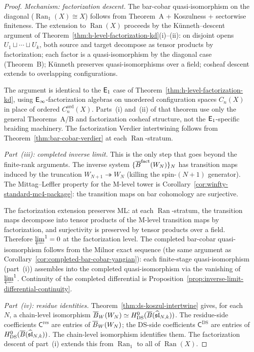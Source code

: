 \begin{proof}
\emph{Mechanism: factorization descent.}
The bar-cobar quasi-isomorphism on the diagonal
($\operatorname{Ran}_1(X) \cong X$) follows from Theorem~A +
Koszulness + sectorwise finiteness.  The extension to
$\operatorname{Ran}(X)$ proceeds by the
K\"unneth--descent argument of
Theorem~\ref{thm:h-level-factorization-kd}(i)--(ii): on
disjoint opens $U_1 \sqcup \cdots \sqcup U_k$, both source and
target decompose as tensor products by factorization; each factor
is a quasi-isomorphism by the diagonal case (Theorem~B);
K\"unneth preserves quasi-isomorphisms over a field; cosheaf
descent extends to overlapping configurations.

The argument is identical to the $\mathsf{E}_1$ case of
Theorem~\ref{thm:h-level-factorization-kd}, using
$\mathsf{E}_{\infty}$-factorization algebras on unordered configuration
spaces $C_n(X)$ in place of ordered $C_n^{\mathrm{ord}}(X)$.
Parts~(i) and~(ii) of that theorem use only the general
Theorems~A/B and factorization cosheaf structure, not the
$\mathsf{E}_1$-specific braiding machinery.
The factorization Verdier intertwining follows from
Theorem~\ref{thm:bar-cobar-verdier} at each
$\operatorname{Ran}$-stratum.

\emph{Part~(iii): completed inverse limit.}
This is the only step that goes beyond the finite-rank arguments.
The inverse system $\{\overline{B}^{\mathrm{fact}}(W_N)\}_{N}$ has
transition maps induced by the truncation
$W_{N+1} \twoheadrightarrow W_N$ (killing the spin-$(N{+}1)$
generator).  The Mittag--Leffler property for the M-level tower
is Corollary~\ref{cor:winfty-standard-mc4-package}: the
transition maps on bar cohomology are surjective.

The factorization extension preserves ML: at each
$\operatorname{Ran}$-stratum, the transition maps decompose into
tensor products of the M-level transition maps by factorization,
and surjectivity is preserved by tensor products over a field.
Therefore $\varprojlim^1 = 0$ at the factorization level.
The completed bar-cobar quasi-isomorphism follows from the
Milnor exact sequence
(the same argument as
Corollary~\ref{cor:completed-bar-cobar-yangian}):
each finite-stage quasi-isomorphism (part~(i)) assembles into
the completed quasi-isomorphism via the vanishing of
$\varprojlim^1$.  Continuity of the completed differential is
Proposition~\ref{prop:inverse-limit-differential-continuity}.

\emph{Part~(iv): residue identities.}
Theorem~\ref{thm:ds-koszul-intertwine} gives, for each~$N$,
a chain-level isomorphism
$\overline{B}_W(W_N) \simeq H^0_{\mathrm{DS}}(\overline{B}(
\widehat{\mathfrak{sl}}_{N,k}))$.
The residue-side coefficients $\mathsf{C}^{\mathrm{res}}$ are
entries of $\overline{B}_W(W_N)$; the DS-side coefficients
$\mathsf{C}^{\mathrm{DS}}$ are entries of
$H^0_{\mathrm{DS}}(\overline{B}(\widehat{\mathfrak{sl}}_{N,k}))$.
The chain-level isomorphism identifies them.
The factorization descent of part~(i) extends this from
$\operatorname{Ran}_1$ to all of $\operatorname{Ran}(X)$.


\end{proof}
